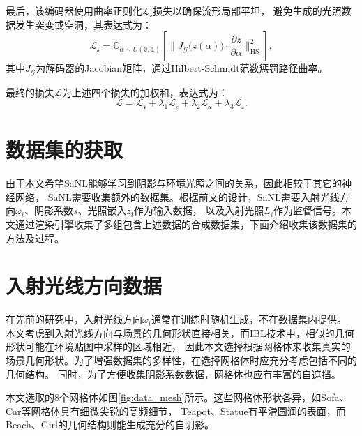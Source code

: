   最后，该编码器使用曲率正则化$\mathcal{L}_{\mathcal{s}}$损失以确保流形局部平坦，
  避免生成的光照数据发生突变或空洞，其表达式为：
  \begin{equation}
  \label{eq:curvature_loss}
  \mathcal{L}_{\mathcal{s}}=\mathbb{C}_{\alpha\sim U\left(\mathbb{0},\mathbb{1}\right)}\left[\|J_{\mathcal{G}}\bigl(z(\alpha)\bigr)\cdot\frac{\partial z}{\partial\alpha}\|_{\mathrm{HS}}^2\right],
  \end{equation}
  其中$J_{\mathcal{G}}$为解码器的Jacobian矩阵，通过Hilbert-Schmidt范数惩罚路径曲率。
  
  最终的损失$\mathcal{L}$为上述四个损失的加权和，表达式为：
  \begin{equation}
  \label{eq:total_loss}
  \mathcal{L}=\mathcal{L}_{\mathcal{r}}+\lambda_1\mathcal{L}_{\mathcal{c}}+\lambda_2\mathcal{L}_{\mathcal{a}}+\lambda_3\mathcal{L}_{\mathcal{s}}.
\end{equation}

\section{数据集的获取}

由于本文希望SaNL能够学习到阴影与环境光照之间的关系，因此相较于其它的神经网络，
SaNL需要收集额外的数据集。根据前文的设计，SaNL需要入射光线方向$\omega_i$、阴影系数$s$、光照嵌入$z_l$作为输入数据，
以及入射光照$L_i$作为监督信号。本文通过渲染引擎收集了多组包含上述数据的合成数据集，下面介绍收集该数据集的方法及过程。

\section{入射光线方向数据}

在先前的研究中，入射光线方向$\omega_i$通常在训练时随机生成，不在数据集内提供。
本文考虑到入射光线方向与场景的几何形状直接相关，而IBL技术中，相似的几何形状可能在环境贴图中采样的区域相近，
因此本文选择根据网格体来收集真实的场景几何形状。为了增强数据集的多样性，在选择网格体时应充分考虑包括不同的几何结构。
同时，为了方便收集阴影系数数据，网格体也应有丰富的自遮挡。

本文选取的8个网格体如图\ref{fig:data_mesh}所示。这些网格体形状各异，如Sofa、Car等网格体具有细微尖锐的高频细节，
Teapot、Statue有平滑圆润的表面，而Beach、Girl的几何结构则能生成充分的自阴影。


